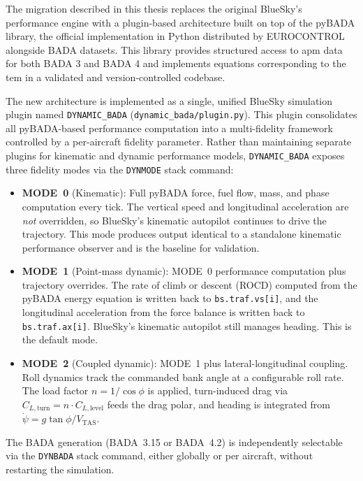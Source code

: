 The migration described in this thesis replaces the original BlueSky's performance engine with a plugin-based architecture built on top of the pyBADA library, the official implementation in Python distributed by EUROCONTROL alongside BADA datasets. This library provides structured access to \gls{apm} data for both BADA 3 and BADA 4 and implements equations corresponding to the \gls{tem} in a validated and version-controlled codebase.

The new architecture is implemented as a single, unified BlueSky simulation plugin named \texttt{DYNAMIC\_BADA} (\texttt{dynamic\_bada/plugin.py}). This plugin consolidates all pyBADA-based performance computation into a multi-fidelity framework controlled by a per-aircraft fidelity parameter. Rather than maintaining separate plugins for kinematic and dynamic performance models, \texttt{DYNAMIC\_BADA} exposes three fidelity modes via the \texttt{DYNMODE} stack command:

\begin{itemize}
    \item \textbf{MODE~0} (Kinematic): Full pyBADA force, fuel flow, mass, and phase computation every tick. The vertical speed and longitudinal acceleration are \emph{not} overridden, so BlueSky's kinematic autopilot continues to drive the trajectory. This mode produces output identical to a standalone kinematic performance observer and is the baseline for validation.
    \item \textbf{MODE~1} (Point-mass dynamic): MODE~0 performance computation plus trajectory overrides. The rate of climb or descent (ROCD) computed from the pyBADA energy equation is written back to \texttt{bs.traf.vs[i]}, and the longitudinal acceleration from the force balance is written back to \texttt{bs.traf.ax[i]}. BlueSky's kinematic autopilot still manages heading. This is the default mode.
    \item \textbf{MODE~2} (Coupled dynamic): MODE~1 plus lateral-longitudinal coupling. Roll dynamics track the commanded bank angle at a configurable roll rate. The load factor $n = 1/\cos\phi$ is applied, turn-induced drag via $C_{L,\text{turn}} = n \cdot C_{L,\text{level}}$ feeds the drag polar, and heading is integrated from $\dot{\psi} = g \tan\phi / V_{\text{TAS}}$.
\end{itemize}

The BADA generation (BADA~3.15 or BADA~4.2) is independently selectable via the \texttt{DYNBADA} stack command, either globally or per aircraft, without restarting the simulation.

